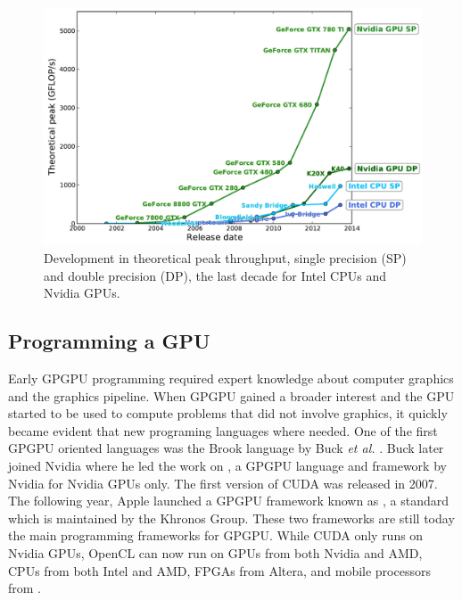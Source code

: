 \begin{figure}
\centering
\includegraphics[width=\textwidth]{img/cpu_vs_gpu.pdf}
\caption{Development in theoretical peak throughput, single precision (SP) and double precision (DP), the last decade for Intel CPUs and Nvidia GPUs.}
\label{fig:cpu_vs_gpu}
\end{figure}

\subsection{Programming a GPU}
Early GPGPU programming required expert knowledge about computer graphics and the graphics pipeline. When GPGPU gained a broader interest and the GPU started to be used to compute problems that did not involve graphics, it quickly became evident that new programing languages where needed.  One of the first GPGPU oriented languages was the Brook language by Buck \textit{et al.} \cite{Buck2004}. Buck later joined Nvidia where he led the work on , a GPGPU language and framework by Nvidia for Nvidia GPUs only. The first version of CUDA was released in 2007. The following year, Apple launched a GPGPU framework known as , a standard which is maintained by the Khronos Group. These two frameworks are still today the main programming frameworks for GPGPU. While CUDA only runs on Nvidia GPUs, OpenCL can now run on GPUs from both Nvidia and AMD, CPUs from both Intel and AMD, FPGAs from Altera, and mobile processors from .

